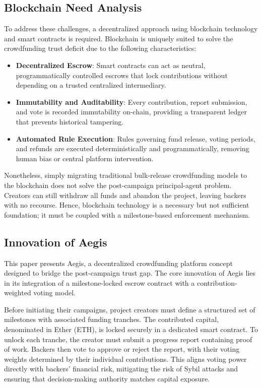 \documentclass[conference]{IEEEtran}
\begin{document}
\subsection{Blockchain Need Analysis}
To address these challenges, a decentralized approach using blockchain technology and smart contracts is required. Blockchain is uniquely suited to solve the crowdfunding trust deficit due to the following characteristics:
\begin{itemize}
	\item \textbf{Decentralized Escrow}: Smart contracts can act as neutral, programmatically controlled escrows that lock contributions without depending on a trusted centralized intermediary.
	\item \textbf{Immutability and Auditability}: Every contribution, report submission, and vote is recorded immutability on-chain, providing a transparent ledger that prevents historical tampering.
	\item \textbf{Automated Rule Execution}: Rules governing fund release, voting periods, and refunds are executed deterministically and programmatically, removing human bias or central platform intervention.
\end{itemize}
Nonetheless, simply migrating traditional bulk-release crowdfunding models to the blockchain does not solve the post-campaign principal-agent problem. Creators can still withdraw all funds and abandon the project, leaving backers with no recourse. Hence, blockchain technology is a necessary but not sufficient foundation; it must be coupled with a milestone-based enforcement mechanism.

\subsection{Innovation of Aegis}
This paper presents Aegis, a decentralized crowdfunding platform concept designed to bridge the post-campaign trust gap. The core innovation of Aegis lies in its integration of a milestone-locked escrow contract with a contribution-weighted voting model. 

Before initiating their campaigns, project creators must define a structured set of milestones with associated funding tranches. The contributed capital, denominated in Ether (ETH), is locked securely in a dedicated smart contract. To unlock each tranche, the creator must submit a progress report containing proof of work. Backers then vote to approve or reject the report, with their voting weights determined by their individual contributions. This aligns voting power directly with backers' financial risk, mitigating the risk of Sybil attacks and ensuring that decision-making authority matches capital exposure.
\end{document}
